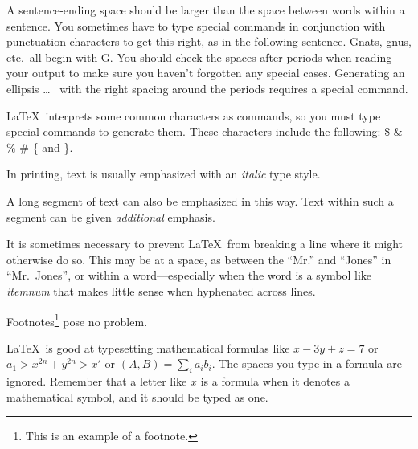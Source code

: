 \documentclass{article}      %
\newcommand{\ip}[2]{(#1, #2)}
\begin{document}
A sentence-ending space should be larger than the
space between words within a sentence.  You
sometimes have to type special commands in
conjunction with punctuation characters to get
this right, as in the following sentence.
       Gnats, gnus, etc.\ all  %
       begin with G\@.         %
You should check the spaces after periods when
reading your output to make sure you haven't
forgotten any special cases.  Generating an
ellipsis
       \ldots\               %
with the right spacing around the periods requires
a special command.

\LaTeX\ interprets some common characters as
commands, so you must type special commands to
generate them.  These characters include the
following:
       \$ \& \% \# \{ and \}.

In printing, text is usually emphasized with an
       \emph{italic}  
type style.  

\begin{em}
   A long segment of text can also be emphasized 
   in this way.  Text within such a segment can be 
   given \emph{additional} emphasis.
\end{em}

It is sometimes necessary to prevent \LaTeX\ from
breaking a line where it might otherwise do so.
This may be at a space, as between the ``Mr.'' and
``Jones'' in
       ``Mr.~Jones'',        %
or within a word---especially when the word is a
symbol like
       \mbox{\emph{itemnum}} 
that makes little sense when hyphenated across
lines.

Footnotes\footnote{This is an example of a footnote.}
pose no problem.

\LaTeX\ is good at typesetting mathematical formulas
like
       \( x-3y + z = 7 \) 
or
       \( a_{1} > x^{2n} + y^{2n} > x' \)
or  
       \( \ip{A}{B} = \sum_{i} a_{i} b_{i} \).
The spaces you type in a formula are 
ignored.  Remember that a letter like
       $x$                   %
is a formula when it denotes a mathematical
symbol, and it should be typed as one.
\end{document}

